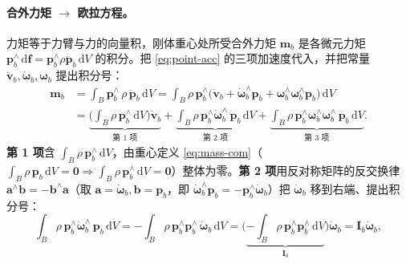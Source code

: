 \paragraph{合外力矩 $\to$ 欧拉方程。}
力矩等于力臂与力的向量积，刚体重心处所受合外力矩 $\boldsymbol{m}_b$ 是各微元力矩 $\boldsymbol{p}_b^\wedge\,\mathrm{d}\boldsymbol{f}=\boldsymbol{p}_b^\wedge\rho\ddot{\boldsymbol{p}}_b\,\mathrm{d}V$ 的积分。把 \cref{eq:point-acc} 的三项加速度代入，并把常量 $\dot{\boldsymbol{v}}_b,\dot{\boldsymbol{\omega}}_b,\boldsymbol{\omega}_b$ 提出积分号\cite{unitree2023quadruped}：
\begin{equation}
\begin{aligned}
  \boldsymbol{m}_b&=\int_B\boldsymbol{p}_b^\wedge\,\rho\,\ddot{\boldsymbol{p}}_b\,\mathrm{d}V
  =\int_B\rho\,\boldsymbol{p}_b^\wedge\big(\dot{\boldsymbol{v}}_b+\dot{\boldsymbol{\omega}}_b^\wedge\boldsymbol{p}_b+\boldsymbol{\omega}_b^\wedge\boldsymbol{\omega}_b^\wedge\boldsymbol{p}_b\big)\,\mathrm{d}V\\
  &=\underbrace{\Big(\!\int_B\rho\,\boldsymbol{p}_b^\wedge\,\mathrm{d}V\Big)\dot{\boldsymbol{v}}_b}_{\text{第 1 项}}
  +\underbrace{\int_B\rho\,\boldsymbol{p}_b^\wedge\dot{\boldsymbol{\omega}}_b^\wedge\,\boldsymbol{p}_b\,\mathrm{d}V}_{\text{第 2 项}}
  +\underbrace{\int_B\rho\,\boldsymbol{p}_b^\wedge\boldsymbol{\omega}_b^\wedge\boldsymbol{\omega}_b^\wedge\,\boldsymbol{p}_b\,\mathrm{d}V}_{\text{第 3 项}}.
\end{aligned}
\label{eq:moment-expand}
\end{equation}
\textbf{第 1 项}含 $\int_B\rho\,\boldsymbol{p}_b^\wedge\,\mathrm{d}V$，由重心定义 \cref{eq:mass-com}（$\int_B\rho\,\boldsymbol{p}_b\,\mathrm{d}V=\mathbf{0}\Rightarrow\int_B\rho\,\boldsymbol{p}_b^\wedge\,\mathrm{d}V=\mathbf{0}$）整体为零。\textbf{第 2 项}用反对称矩阵的反交换律 $\boldsymbol{a}^\wedge\boldsymbol{b}=-\boldsymbol{b}^\wedge\boldsymbol{a}$（取 $\boldsymbol{a}=\dot{\boldsymbol{\omega}}_b,\boldsymbol{b}=\boldsymbol{p}_b$，即 $\dot{\boldsymbol{\omega}}_b^\wedge\boldsymbol{p}_b=-\boldsymbol{p}_b^\wedge\dot{\boldsymbol{\omega}}_b$）把 $\dot{\boldsymbol{\omega}}_b$ 移到右端、提出积分号\cite{unitree2023quadruped}：
\begin{equation}
  \int_B\rho\,\boldsymbol{p}_b^\wedge\dot{\boldsymbol{\omega}}_b^\wedge\,\boldsymbol{p}_b\,\mathrm{d}V
  =-\int_B\rho\,\boldsymbol{p}_b^\wedge\boldsymbol{p}_b^\wedge\,\dot{\boldsymbol{\omega}}_b\,\mathrm{d}V
  =\Big(\underbrace{-\!\int_B\rho\,\boldsymbol{p}_b^\wedge\boldsymbol{p}_b^\wedge\,\mathrm{d}V}_{\mathbf{I}_b}\Big)\dot{\boldsymbol{\omega}}_b
  =\mathbf{I}_b\dot{\boldsymbol{\omega}}_b,
  \label{eq:moment-term2}
\end{equation}
